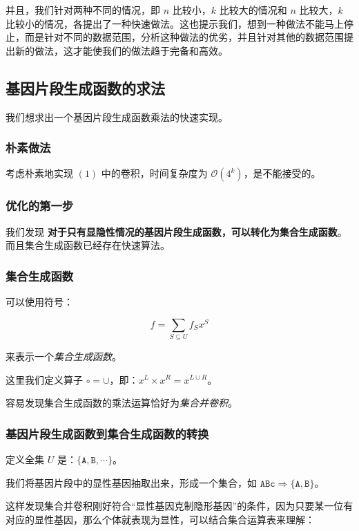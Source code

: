 \documentclass{article}
\begin{document}
并且，我们针对两种不同的情况，即 $n$ 比较小，$k$ 比较大的情况和 $n$ 比较大，$k$ 比较小的情况，各提出了一种快速做法。这也提示我们，想到一种做法不能马上停止，而是针对不同的数据范围，分析这种做法的优劣，并且针对其他的数据范围提出新的做法，这才能使我们的做法趋于完备和高效。

\newpage

\subsection{基因片段生成函数的求法}

我们想求出一个基因片段生成函数乘法的快速实现。

\subsubsection*{朴素做法}

考虑朴素地实现 $(1)$ 中的卷积，时间复杂度为 $\mathcal O(4^k)$，是不能接受的。

\subsubsection*{优化的第一步}

我们发现 \textbf{对于只有显隐性情况的基因片段生成函数，可以转化为集合生成函数}。而且集合生成函数已经存在快速算法。

\subsubsection*{集合生成函数}

可以使用符号：

$$f=\sum_{S \subseteq U} f_S x^S$$

来表示一个\textsl{集合生成函数}。

这里我们定义算子 $\circ=\cup$，即：$x^L \times x^R=x^{L \cup R}$。

容易发现集合生成函数的乘法运算恰好为\textsl{集合并卷积}。

\subsubsection*{基因片段生成函数到集合生成函数的转换}

定义全集 $U$ 是：$\{\texttt{A},\texttt{B},\cdots\}$。

我们将基因片段中的显性基因抽取出来，形成一个集合，如 $\texttt{ABc} \Rightarrow \{\texttt{A},\texttt{B}\}$。

这样发现集合并卷积刚好符合“显性基因克制隐形基因”的条件，因为只要某一位有对应的显性基因，那么个体就表现为显性，可以结合集合运算表来理解：
\end{document}
